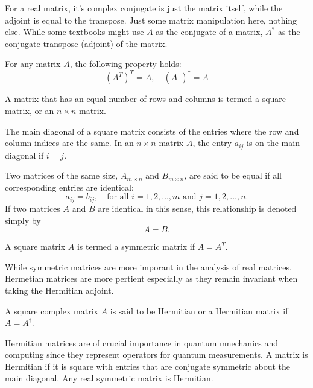 \documentclass[12pt]{article}
\begin{document}
For a real matrix, it's complex conjugate is just the matrix itself, while the adjoint is equal to the transpose. Just some matrix manipulation here, nothing else. While some textbooks might use $\overline{A}$ as the conjugate of a matrix, $A^*$ as the conjugate transpose (adjoint) of the matrix. 

\begin{theorem}
    For any matrix $A$, the following property holds: 
    $$
    (A^T)^T = A, \quad (A^\dagger)^\dagger = A
    $$
\end{theorem}

\begin{definition}
    A matrix that has an equal number of rows and columns is termed a square matrix, or an $n \times n$ matrix.
\end{definition}

\begin{definition}
    The main diagonal of a square matrix consists of the entries where the row and column indices are the same. In an $n \times n$ matrix $A$, the entry $a_{ij}$ is on the main diagonal if $i = j$.
\end{definition}

\begin{definition}
    Two matrices of the same size, $A_{m \times n}$ and $B_{m \times n}$, are said to be equal if all corresponding entries are identical:
    \[
    a_{ij} = b_{ij}, \quad \text{for all } i = 1,2,\ldots,m \text{ and } j = 1,2,\ldots,n.
    \]
    If two matrices $A$ and $B$ are identical in this sense, this relationship is denoted simply by
    \[
    A = B.
    \]
\end{definition}

\begin{definition}
    A square matrix $A$ is termed a symmetric matrix if $A = A^T$. 
\end{definition}

While symmetric matrices are more imporant in the analysis of real matrices, Hermetian matrices are more pertient especially as they remain invariant when taking the Hermitian adjoint. 

\begin{definition}
    A square complex matrix $A$ is said to be Hermitian or a Hermitian matrix if $A = A^\dagger$.
\end{definition}

Hermitian matrices are of crucial importance in quantum mnechanics and computing since they represent operators for quantum measurements. A matrix is Hermitian if it is square with entries that are conjugate symmetric about the main diagonal. Any real symmetric matrix is Hermitian. 
\end{document}
